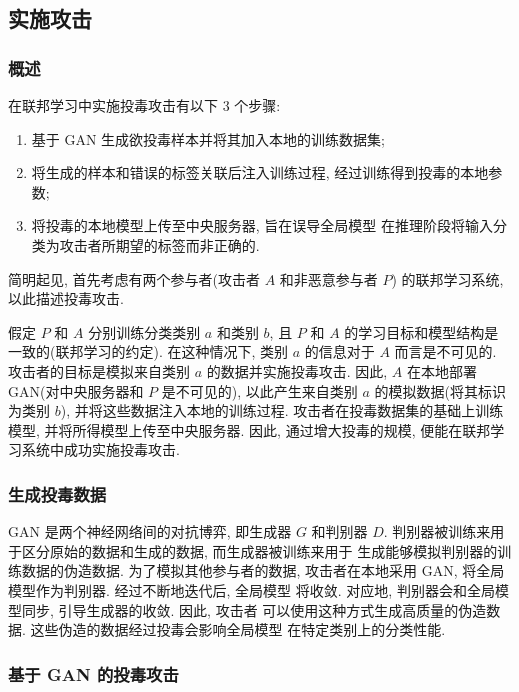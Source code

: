 \documentclass[../main.tex]{subfiles}
\begin{document}
\subsection{实施攻击}
\subsubsection{概述}
在联邦学习中实施投毒攻击有以下 $ 3 $ 个步骤:
\begin{enumerate}
  \item 基于 GAN 生成欲投毒样本并将其加入本地的训练数据集;
  \item 将生成的样本和错误的标签关联后注入训练过程,
    经过训练得到投毒的本地参数;
  \item 将投毒的本地模型上传至中央服务器, 旨在误导全局模型
    在推理阶段将输入分类为攻击者所期望的标签而非正确的.
\end{enumerate}
%
简明起见, 首先考虑有两个参与者(攻击者 $ A $ 和非恶意参与者 $ P $)
的联邦学习系统, 以此描述投毒攻击.

假定 $ P $ 和 $ A $ 分别训练分类类别 $ a $ 和类别 $ b $, 且 $ P $ 和
$ A $ 的学习目标和模型结构是一致的(联邦学习的约定).
在这种情况下, 类别 $ a $ 的信息对于 $ A $ 而言是不可见的.
攻击者的目标是模拟来自类别 $ a $ 的数据并实施投毒攻击.
因此, $ A $ 在本地部署 GAN(对中央服务器和 $ P $ 是不可见的),
以此产生来自类别 $ a $ 的模拟数据(将其标识为类别 $ b $), 并将这些数据注入本地的训练过程.
攻击者在投毒数据集的基础上训练模型, 并将所得模型上传至中央服务器.
因此, 通过增大投毒的规模, 便能在联邦学习系统中成功实施投毒攻击.
%
\subsubsection{生成投毒数据}
GAN 是两个神经网络间的对抗博弈, 即生成器 $ G $ 和判别器 $ D $.
判别器被训练来用于区分原始的数据和生成的数据, 而生成器被训练来用于
生成能够模拟判别器的训练数据的伪造数据. 为了模拟其他参与者的数据,
攻击者在本地采用 GAN, 将全局模型作为判别器. 经过不断地迭代后, 全局模型
将收敛. 对应地, 判别器会和全局模型同步, 引导生成器的收敛. 因此, 攻击者
可以使用这种方式生成高质量的伪造数据. 这些伪造的数据经过投毒会影响全局模型
在特定类别上的分类性能.
\subsubsection{基于 GAN 的投毒攻击}
%
\end{document}
